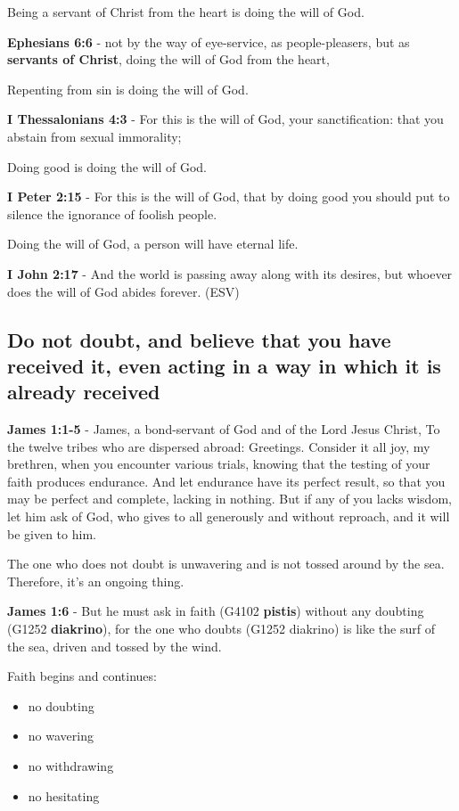 \documentclass[11pt]{article}
\begin{document}
Being a servant of Christ from the heart is doing the will of God.

\textbf{Ephesians 6:6} - not by the way of eye-service, as people-pleasers, but as \textbf{servants of Christ}, doing the will of God from the heart,

Repenting from sin is doing the will of God.

\textbf{I Thessalonians 4:3} - For this is the will of God, your sanctification: that you abstain from sexual immorality;

Doing good is doing the will of God.

\textbf{I Peter 2:15} - For this is the will of God, that by doing good you should put to silence the ignorance of foolish people.

Doing the will of God, a person will have eternal life.

\textbf{I John 2:17} - And the world is passing away along with its desires, but whoever does the will of God abides forever. (ESV)

\subsection{Do not doubt, and believe that you have received it, even acting in a way in which it is already received}
\label{sec:org7b9896e}
\textbf{James 1:1-5} - James, a bond-servant of God and of the Lord Jesus Christ, To the twelve tribes who are dispersed abroad: Greetings.  Consider it all joy, my brethren, when you encounter various trials, knowing that the testing of your faith produces endurance.  And let endurance have its perfect result, so that you may be perfect and complete, lacking in nothing.  But if any of you lacks wisdom, let him ask of God, who gives to all generously and without reproach, and it will be given to him.

The one who does not doubt is unwavering and is not tossed around by the sea.
Therefore, it's an ongoing thing.

\textbf{James 1:6} - But he must ask in faith (G4102 \textbf{pistis}) without any doubting (G1252 \textbf{diakrino}), for the one who doubts (G1252 diakrino) is like the surf of the sea, driven and tossed by the wind.

Faith begins and continues:
\begin{itemize}
\item no doubting
\item no wavering
\item no withdrawing
\item no hesitating
\end{itemize}
\end{document}
